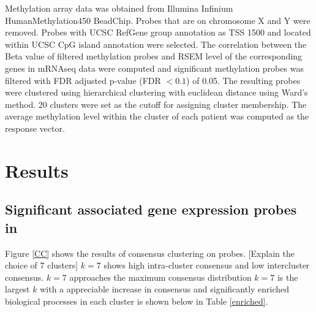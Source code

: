 \documentclass{article}
\begin{document}
Methylation array data was obtained from Illumina Infinium HumanMethylation450 BeadChip. Probes that are on chromosome X and Y were removed. Probes with UCSC RefGene group annotation as TSS 1500 and located within UCSC CpG island annotation were selected. The correlation between the Beta value of filtered methylation probes and RSEM level of the corresponding genes in mRNAseq data were computed and significant methylation probes was filtered with FDR adjusted p-value (FDR $< 0.1$) of 0.05. The resulting probes were clustered using hierarchical clustering with euclidean distance using Ward's method. 20 clusters were set as the cutoff for assigning cluster membership. The average methylation level within the cluster of each patient was computed as the response vector. 


\section{Results}

\subsection{Significant associated gene expression probes in \citet{figueroa2010dna}}

Figure \ref{CC} shows the results of consensus clustering on probes. [Explain the choice of 7 clusters]
 $k = 7$ shows high intra-cluster consensus and low intercluster consensus.
$k = 7$ approaches the maximum consensus distribution 
$k = 7$ is the largest $k$ with a appreciable increase in consensus 
 and significantly enriched biological processes in each cluster is shown below in Table \ref{enriched}. 
\end{document}
